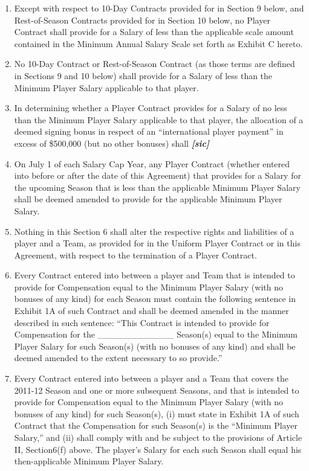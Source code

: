 \documentclass[
]{book}
\begin{document}
\begin{enumerate}
\def\labelenumi{(\alph{enumi})}
\item
  Except with respect to 10-Day Contracts provided for in Section 9 below, and Rest-of-Season Contracts provided for in Section 10 below, no Player Contract shall provide for a Salary of less than the applicable scale amount contained in the Minimum Annual Salary Scale set forth as Exhibit C hereto.
\item
  No 10-Day Contract or Rest-of-Season Contract (as those terms are defined in Sections 9 and 10 below) shall provide for a Salary of less than the Minimum Player Salary applicable to that player.
\item
  In determining whether a Player Contract provides for a Salary of no less than the Minimum Player Salary applicable to that player, the allocation of a deemed signing bonus in respect of an ``international player payment'' in excess of \$500,000 (but no other bonuses) shall \textbf{\emph{{[}sic{]}}}
\item
  On July 1 of each Salary Cap Year, any Player Contract (whether entered into before or after the date of this Agreement) that provides for a Salary for the upcoming Season that is less than the applicable Minimum Player Salary shall be deemed amended to provide for the applicable Minimum Player Salary.
\item
  Nothing in this Section 6 shall alter the respective rights and liabilities of a player and a Team, as provided for in the Uniform Player Contract or in this Agreement, with respect to the termination of a Player Contract.
\item
  Every Contract entered into between a player and Team that is intended to provide for Compensation equal to the Minimum Player Salary (with no bonuses of any kind) for each Season must contain the following sentence in Exhibit 1A of such Contract and shall be deemed amended in the manner described in such sentence: ``This Contract is intended to provide for Compensation for the \_\_\_\_\_\_\_\_\_\_\_\_ Season(s) equal to the Minimum Player Salary for such Season(s) (with no bonuses of any kind) and shall be deemed amended to the extent necessary to so provide.''
\item
  Every Contract entered into between a player and a Team that covers the 2011-12 Season and one or more subsequent Seasons, and that is intended to provide for Compensation equal to the Minimum Player Salary (with no bonuses of any kind) for such Season(s), (i) must state in Exhibit 1A of such Contract that the Compensation for such Season(s) is the ``Minimum Player Salary,'' and (ii) shall comply with and be subject to the provisions of Article II, Section6(f) above. The player's Salary for each such Season shall equal his then-applicable Minimum Player Salary.

\end{enumerate}
\end{document}
